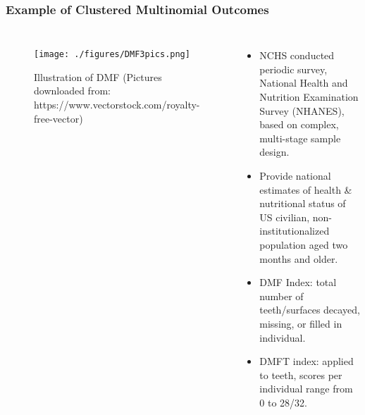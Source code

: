 \documentclass[hyperref={bookmarks=false},aspectratio=169]{beamer}
\begin{document}
\begin{frame}
\frametitle{Example of Clustered Multinomial Outcomes}

\begin{columns}


\begin{figure}
    \centering
    \texttt{[image: ./figures/DMF3pics.png]}
    \caption{Illustration of DMF \newline \tiny{(Pictures downloaded from: https://www.vectorstock.com/royalty-free-vector)}}
    \label{fig:toothDMF3Left}
\end{figure}

\begin{itemize}
    \item NCHS conducted periodic survey, National Health and Nutrition Examination Survey (NHANES), based on complex, multi-stage sample design.
    \item Provide national estimates of health {\&} nutritional status of US civilian, non-institutionalized population aged two months and older.
    \item DMF Index: total number of teeth/surfaces decayed, missing, or filled in individual.
    \item DMFT index: applied to teeth, scores per individual range from 0 to 28/32.
\end{itemize}

\end{columns}
\end{frame}
\end{document}
